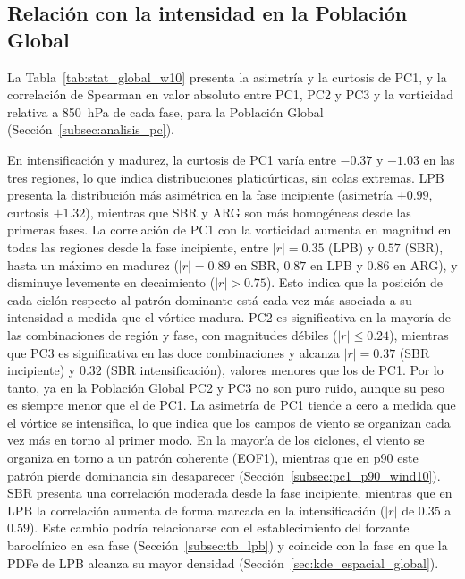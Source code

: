 \subsection{Relación con la intensidad en la Población Global}\label{subsec:pc1_global_wind10}

La Tabla~\ref{tab:stat_global_w10} presenta la asimetría y la curtosis de PC1, y la correlación de Spearman en valor absoluto entre PC1, PC2 y PC3 y la vorticidad relativa a 850~hPa de cada fase, para la Población Global (Sección~\ref{subsec:analisis_pc}).

En intensificación y madurez, la curtosis de PC1 varía entre $-0.37$ y $-1.03$ en las tres regiones, lo que indica distribuciones platicúrticas, sin colas extremas. LPB presenta la distribución más asimétrica en la fase incipiente (asimetría $+0.99$, curtosis $+1.32$), mientras que SBR y ARG son más homogéneas desde las primeras fases. La correlación de PC1 con la vorticidad aumenta en magnitud en todas las regiones desde la fase incipiente, entre $|r|=0.35$ (LPB) y $0.57$ (SBR), hasta un máximo en madurez ($|r|=0.89$ en SBR, $0.87$ en LPB y $0.86$ en ARG), y disminuye levemente en decaimiento ($|r| > 0.75$). Esto indica que la posición de cada ciclón respecto al patrón dominante está cada vez más asociada a su intensidad a medida que el vórtice madura. PC2 es significativa en la mayoría de las combinaciones de región y fase, con magnitudes débiles ($|r| \leq 0.24$), mientras que PC3 es significativa en las doce combinaciones y alcanza $|r|=0.37$ (SBR incipiente) y $0.32$ (SBR intensificación), valores menores que los de PC1. Por lo tanto, ya en la Población Global PC2 y PC3 no son puro ruido, aunque su peso es siempre menor que el de PC1.
La asimetría de PC1 tiende a cero a medida que el vórtice se intensifica, lo que indica que los campos de viento se organizan cada vez más en torno al primer modo. En la mayoría de los ciclones, el viento se organiza en torno a un patrón coherente (EOF1), mientras que en p90 este patrón pierde dominancia sin desaparecer (Sección~\ref{subsec:pc1_p90_wind10}).
SBR presenta una correlación moderada desde la fase incipiente, mientras que en LPB la correlación aumenta de forma marcada en la intensificación ($|r|$ de $0.35$ a $0.59$). Este cambio podría relacionarse con el establecimiento del forzante baroclínico en esa fase (Sección~\ref{subsec:tb_lpb}) y coincide con la fase en que la PDFe de LPB alcanza su mayor densidad (Sección~\ref{sec:kde_espacial_global}).




